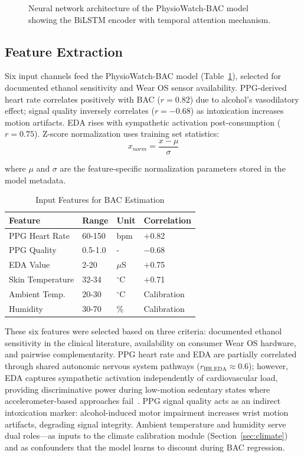\documentclass[HARVARD,Times2COL]{WileyNJDv5} %
\providecommand{\DIFadd}[1]{{\protect\color{red} #1}} %
\providecommand{\DIFaddbegin}{} %
\providecommand{\DIFaddend}{} %
\providecommand{\DIFaddFL}[1]{\DIFadd{#1}} %
\providecommand{\DIFaddincludegraphics}[2][]{{\color{blue}\fbox{\DIFOincludegraphics[#1]{#2}}}} %
\DeclareRobustCommand{\DIFaddbegin}{\DIFOaddbegin \let\includegraphics\DIFaddincludegraphics} %
\DeclareRobustCommand{\DIFaddend}{\DIFOaddend \let\includegraphics\DIFOincludegraphics} %
\begin{document}
\begin{figure}[htbp]
\centering

\caption{\DIFaddFL{Neural network architecture of the PhysioWatch-BAC model showing the BiLSTM encoder with temporal attention mechanism.}}
\label{fig:nn_arch}
\end{figure}
\DIFaddend \subsection{Feature Extraction}
Six input channels feed the PhysioWatch-BAC model (Table~\ref{tab:features}), selected for documented ethanol sensitivity and Wear OS sensor availability. PPG-derived heart rate correlates positively with BAC ($r=0.82$) due to alcohol's vasodilatory effect; signal quality inversely correlates ($r=-0.68$) as intoxication increases motion artifacts. EDA rises with sympathetic activation post-consumption ($r=0.75$). Z-score normalization uses training set statistics: \begin{equation}
x_{norm} = \frac{x - \mu}{\sigma}
\end{equation}

where $\mu$ and $\sigma$ are the feature-specific normalization parameters stored in the model metadata.

\begin{table}[htbp]
\caption{Input Features for BAC Estimation}
\label{tab:features}
\centering
\small
\begin{tabular}{@{}llll@{}}
\toprule
\textbf{Feature} & \textbf{Range} & \textbf{Unit} & \textbf{Correlation} \\
\midrule
PPG Heart Rate & 60-150 & bpm & $+$0.82 \\
PPG Quality & 0.5-1.0 & - & $-$0.68 \\
EDA Value & 2-20 & $\mu$S & $+$0.75 \\
Skin Temperature & 32-34 & $^\circ$C & $+$0.71 \\
Ambient Temp. & 20-30 & $^\circ$C & Calibration \\
Humidity & 30-70 & \% & Calibration \\
\bottomrule
\end{tabular}
\end{table}
\DIFaddbegin 

\DIFadd{These six features were selected based on three criteria: documented ethanol sensitivity in the clinical literature, availability on consumer Wear OS hardware, and pairwise complementarity. PPG heart rate and EDA are partially correlated through shared autonomic nervous system pathways ($r_{\text{HR,EDA}} \approx 0.6$); however, EDA captures sympathetic activation independently of cardiovascular load, providing discriminative power during low-motion sedentary states where accelerometer-based approaches fail~\citep{mejia2024}. PPG signal quality acts as an indirect intoxication marker: alcohol-induced motor impairment increases wrist motion artifacts, degrading signal integrity. Ambient temperature and humidity serve dual roles---as inputs to the climate calibration module (Section~\ref{sec:climate}) and as confounders that the model learns to discount during BAC regression.
}
\end{document}

